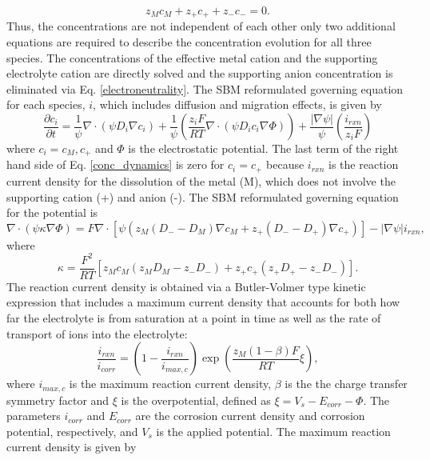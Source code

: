 \documentclass[11pt]{article}
\renewcommand{\=}[1]{\stackrel{#1}{=}} %
\theoremstyle{definition}
\theoremstyle{remark}
\begin{document}
\begin{equation}
\label{electroneutrality}
z_M c_M + z_+ c_+ + z_-c_- = 0.
 \end{equation}
Thus, the concentrations are not independent of each other only two additional equations are required to describe the concentration evolution for all three species.  The concentrations of the effective metal cation and the supporting electrolyte cation are directly solved and the supporting anion concentration is eliminated via Eq. \eqref{electroneutrality}. The SBM reformulated governing equation for each species, $i$, which includes diffusion and migration effects, is given by
\begin{equation}
\label{conc_dynamics}
\frac{\partial c_i}{\partial t}=\frac{1}{\psi} \nabla \cdot (\psi D_i \nabla c_i) + \frac{1}{\psi} \left( \frac{z_i F}{RT} \nabla \cdot (\psi D_i c_i \nabla \Phi) \right)
+ \frac{|\nabla \psi|}{\psi} \left( \frac{i_{rxn}}{z_i F} \right)
\end{equation}
\noindent where $c_i =c_M, c_+$ and $\Phi$ is the electrostatic potential.  The last term of the right hand side of Eq. \eqref{conc_dynamics} is zero for $c_i =c_+$  because $i_{rxn}$ is the reaction current density for the dissolution of the metal (M), which does not involve the supporting cation (+) and anion (-). The SBM reformulated governing equation for the potential is
\begin{equation}
\nabla \cdot (\psi \kappa \nabla \Phi) = F \nabla \cdot \left[ \psi \left( z_M (D_- - D_M) \nabla c_M + z_+ (D_- - D_+)  \nabla c_+ \right) \right] - |\nabla \psi | i_{rxn},
\end{equation}
where 
\begin{equation}
\kappa =\frac{F^2}{RT}\left[ z_Mc_M\left( z_MD_M-z_-D_-\right) + z_+c_+\left( z_+D_+-z_-D_-\right) \right].
\end{equation}
The reaction current density is obtained via a Butler-Volmer type kinetic expression that includes a maximum current density that accounts for both how far the electrolyte is from saturation at a point in time as well as the rate of transport of ions into the electrolyte:
\begin{equation}
\frac{i_{rxn}}{i_{corr}}= \left( 1 - \frac{i_{rxn}}{i_{max,c}} \right) \exp \left( \frac{z_M (1-\beta) F}{RT}\xi \right),
\end{equation}
where $i_{max,c}$ is the maximum reaction current density, $\beta$ is the the charge transfer symmetry factor and $\xi$ is the overpotential, defined as $\xi=V_s-E_{corr}-\Phi$. The parameters $i_{corr}$ and $E_{corr}$ are the corrosion current density and corrosion potential, respectively, and $V_s$ is the applied potential. The maximum reaction current density is given by
\end{document}

